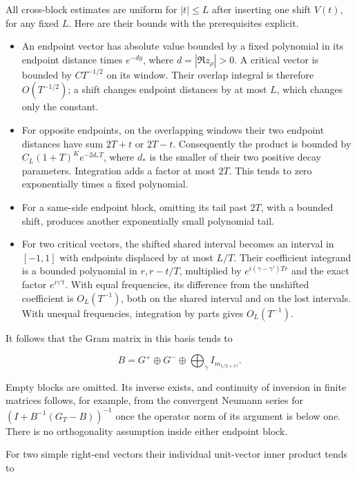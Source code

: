 All cross-block estimates are uniform for \(|t|\leq L\) after inserting
one shift \(V(t)\), for any fixed \(L\). Here are their bounds with the
prerequisites explicit.

\begin{itemize}
\tightlist
\item
  An endpoint vector has absolute value bounded by a fixed polynomial in
  its endpoint distance times \(e^{-d y}\), where \(d=|\Re z_\rho|>0\).
  A critical vector is bounded by \(C T^{-1/2}\) on its window. Their
  overlap integral is therefore \(O(T^{-1/2})\); a shift changes
  endpoint distances by at most \(L\), which changes only the constant.
\item
  For opposite endpoints, on the overlapping windows their two endpoint
  distances have sum \(2T+t\) or \(2T-t\). Consequently the product is
  bounded by \(C_L(1+T)^K e^{-2d_*T}\), where \(d_*\) is the smaller of
  their two positive decay parameters. Integration adds a factor at most
  \(2T\). This tends to zero exponentially times a fixed polynomial.
\item
  For a same-side endpoint block, omitting its tail past \(2T\), with a
  bounded shift, produces another exponentially small polynomial tail.
\item
  For two critical vectors, the shifted shared interval becomes an
  interval in \([-1,1]\) with endpoints displaced by at most \(L/T\).
  Their coefficient integrand is a bounded polynomial in \(r,r-t/T\),
  multiplied by \(e^{i(\gamma-\gamma')Tr}\) and the exact factor
  \(e^{i\gamma't}\). With equal frequencies, its difference from the
  unshifted coefficient is \(O_L(T^{-1})\), both on the shared interval
  and on the lost intervals. With unequal frequencies, integration by
  parts gives \(O_L(T^{-1})\).
\end{itemize}

It follows that the Gram matrix in this basis tends to

\[
 B=G^+\oplus G^-\oplus\bigoplus_{\gamma}I_{m_{1/2+i\gamma}}.
\tag{FGC3.3}
\]

Empty blocks are omitted. Its inverse exists, and continuity of
inversion in finite matrices follows, for example, from the convergent
Neumann series for \((I+B^{-1}(G_T-B))^{-1}\) once the operator norm of
its argument is below one. There is no orthogonality assumption inside
either endpoint block.

For two simple right-end vectors their individual unit-vector inner
product tends to

